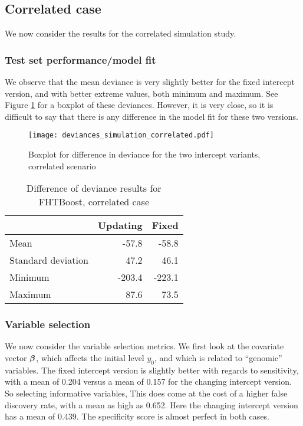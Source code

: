 \subsection{Correlated case}
We now consider the results for the correlated simulation study.

\subsubsection{Test set performance/model fit}
We observe that the mean deviance is very slightly better for the fixed intercept version, and with better extreme values, both minimum and maximum.
See Figure \ref{fig:simulation-correlated-deviances-boxplot} for a boxplot of these deviances.
However, it is very close, so it is difficult to say that there is any difference in the model fit for these two versions.

\begin{figure}
\caption{Boxplot for difference in deviance for the two intercept variants, correlated scenario}
\label{fig:simulation-correlated-deviances-boxplot}
\centering\texttt{[image: deviances\_simulation\_correlated.pdf]}
\end{figure}


\begin{table}
\caption{Difference of deviance results for FHTBoost, correlated case}
\label{table:uncorrelated-deviance}
\centering
\begin{tabular}{l|rr}
\toprule
& Updating & Fixed \\
\hline
Mean               &  -57.8  &  -58.8  \\
Standard deviation &   47.2  &   46.1  \\
Minimum            & -203.4  & -223.1  \\
Maximum            &   87.6  &   73.5  \\
\bottomrule
\end{tabular}
\end{table}


\subsubsection{Variable selection}
We now consider the variable selection metrics.
We first look at the covariate vector $\boldsymbol{\beta}$, which affects the initial level $y_0$, and which is related to ``genomic'' variables.
The fixed intercept version is slightly better with regards to sensitivity, with a mean of 0.204 versus a mean of 0.157 for the changing intercept version.
So selecting informative variables,
This does come at the cost of a higher false discovery rate, with a mean as high as 0.652.
Here the changing intercept version has a mean of 0.439.
The specificity score is almost perfect in both cases.

